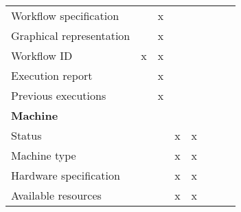 \begin{table}[htbp]
{\begin{tabular}{lccccccc}
            Workflow specification              &                   & x                             &                          &                     &                         &                           &                           \\
            Graphical representation            &                   & x                             &                          &                     &                         &                           &                           \\
            Workflow ID                         & x                 & x                             &                          &                     &                         &                           &                           \\
            Execution report                    &                   & x                             &                          &                     &                         &                           &                           \\
            Previous executions                 &                   & x                             &                          &                     &                         &                           &                           \\
            \midrule
            \multicolumn{8}{l}{\textbf{Machine}}                                                                                                                                                                                       \\[3pt]
            Status                              &                   &                               & x                        & x                   &                         &                           &                           \\
            Machine type                        &                   &                               & x                        & x                   &                         &                           &                           \\
            Hardware specification              &                   &                               & x                        & x                   &                         &                           &                           \\
            Available resources                 &                   &                               & x                        & x                   &                         &                           &                           \\

\end{tabular}}
\end{table}
